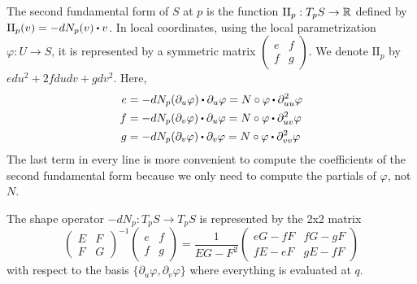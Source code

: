 \begin{definition}
    The second fundamental form of $S$ at $p$ is the function $\text{II}_p : T_pS \to \mathbb{R}$ defined by $\text{II}_p(v) = -dN_p(v)\bigcdot v$. In local coordinates, using the local parametrization $\varphi : U \to S$, it is represented by a symmetric matrix $\begin{pmatrix}
        e & f \\ f & g
    \end{pmatrix}$. We denote $\text{II}_p$ by $edu^2 + 2 fdudv + gdv^2$. Here,
    \begin{align*}
        e &= -dN_p(\partial_u \varphi)\bigcdot \partial_u \varphi = N\circ \varphi \bigcdot \partial_{uu}^2 \varphi \\
        f &= -dN_p(\partial_v \varphi)\bigcdot \partial_u \varphi = N\circ \varphi \bigcdot \partial_{uv}^2 \varphi \\
        g &= -dN_p(\partial_v \varphi)\bigcdot \partial_v \varphi = N\circ \varphi \bigcdot \partial_{vv}^2 \varphi 
    \end{align*}
    The last term in every line is more convenient to compute the coefficients of the second fundamental form because we only need to compute the partials of $\varphi$, not $N$.
\end{definition}

\begin{proposition}
    The shape operator $-dN_p : T_pS \to T_p S$ is represented by the 2x2 matrix
    $$\begin{pmatrix}
        E & F \\ F & G
    \end{pmatrix}^{-1}\begin{pmatrix}
        e & f \\ f & g
    \end{pmatrix} = \frac{1}{EG-F^2}\begin{pmatrix}
        eG - fF & fG - gF \\ fE - eF & gE - fF
    \end{pmatrix}$$
    with respect to the basis $\{\partial_u \varphi, \partial_v \varphi\}$ where everything is evaluated at $q$.
\end{proposition}

